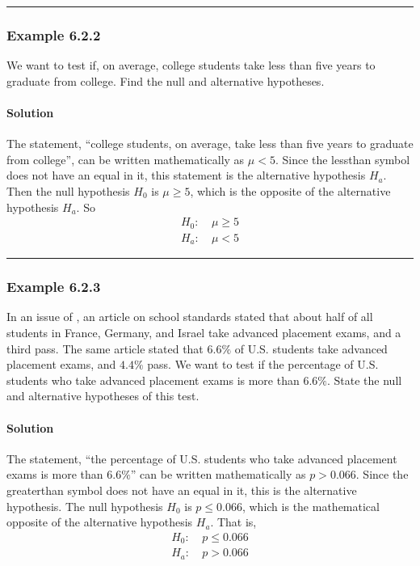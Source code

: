 \documentclass[letterpaper,10pt,english]{jupyterBook}
\begin{document}
\bigskip\hrule\bigskip



\subsubsection{Example 6.2.2}
\label{\detokenize{Ch6 An Introduction to Hypothesis Testing/6.2 Hypotheses and Errors:example-6-2-2}}
\sphinxAtStartPar
We want to test if, on average, college students take less than five years to graduate from college. Find the null and alternative hypotheses.


\paragraph{Solution}
\label{\detokenize{Ch6 An Introduction to Hypothesis Testing/6.2 Hypotheses and Errors:id1}}
\sphinxAtStartPar
The statement, “college students, on average, take less than five years to graduate from college”, can be written mathematically as \(\mu < 5\). Since the less\sphinxhyphen{}than symbol does not have an equal in it, this statement is the alternative hypothesis \(H_a\). Then the null hypothesis \(H_0\) is \(\mu \geq 5\), which is the opposite of the alternative hypothesis \(H_a\). So
\begin{align*}
H_0:&\  \mu \geq 5 \\
H_a:&\  \mu < 5
\end{align*}

\bigskip\hrule\bigskip



\subsubsection{Example 6.2.3}
\label{\detokenize{Ch6 An Introduction to Hypothesis Testing/6.2 Hypotheses and Errors:example-6-2-3}}
\sphinxAtStartPar
In an issue of , an article on school standards stated that about half of all students in France, Germany, and Israel take advanced placement exams, and a third pass. The same article stated that \(6.6\%\) of U.S. students take advanced placement exams, and \(4.4\%\) pass. We want to test if the percentage of U.S. students who take advanced placement exams is more than \(6.6\%\). State the null and alternative hypotheses of this test.


\paragraph{Solution}
\label{\detokenize{Ch6 An Introduction to Hypothesis Testing/6.2 Hypotheses and Errors:id2}}
\sphinxAtStartPar
The statement, “the percentage of U.S. students who take advanced placement exams is more than \(6.6\%\)” can be written mathematically as \(p > 0.066\). Since the greater\sphinxhyphen{}than symbol does not have an equal in it, this is the alternative hypothesis. The null hypothesis \(H_0\) is \(p \leq 0.066\), which is the mathematical opposite of the alternative hypothesis \(H_a\). That is,
\begin{align*}
H_0:&\ p \leq 0.066 \\
H_a:&\ p > 0.066
\end{align*}
\end{document}
